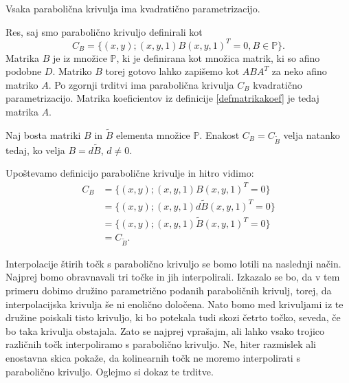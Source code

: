 \documentclass[mat1]{fmfdelo}
\newcommand{\PP}{\mathbb P}
\begin{document}
\begin{posledica}\label{vsakaparabola}
Vsaka parabolična krivulja ima kvadratično parametrizacijo.
\end{posledica}

\begin{dokaz}
Res, saj smo parabolično krivuljo definirali kot
$$ C_B = \{ (x,y); (x,y,1) B (x, y, 1)^T = 0, B \in \PP \}.$$
Matrika $B$ je iz množice $\PP$, ki je definirana kot množica matrik, ki so afino podobne $D$. Matriko $B$ torej gotovo lahko zapišemo kot $ABA^T$ za neko afino matriko $A$. Po zgornji trditvi ima parabolična krivulja $C_B$ kvadratično parametrizacijo. Matrika koeficientov iz definicije \ref{defmatrikakoef} je tedaj matrika $A$.
\end{dokaz}


\begin{posledica}\label{bb*}
Naj bosta matriki $B$ in $\widetilde{B}$ elementa množice $\PP$. Enakost $C_B = C_{\widetilde{B}}$ velja natanko tedaj, ko velja $B = d \widetilde{B}$, $d \neq 0$.
\end{posledica}

\begin{dokaz}
Upoštevamo definicijo parabolične krivulje in hitro vidimo:
\begin{align*}
C_B    &= \{ (x,y); (x,y,1) B (x, y, 1)^T = 0\} \\
	&= \{ (x,y); (x,y,1) d \widetilde{B} (x, y, 1)^T = 0\} \\
	&= \{ (x,y); (x,y,1) \widetilde{B} (x, y, 1)^T = 0\} \\
	&= C_{\widetilde{B}}.
\end{align*}
\end{dokaz}

Interpolacije štirih točk s parabolično krivuljo se bomo lotili na naslednji način. Najprej bomo obravnavali tri točke in jih interpolirali. Izkazalo se bo, da v tem primeru dobimo družino parametrično podanih paraboličnih krivulj, torej, da interpolacijska krivulja še ni enolično določena. Nato bomo med krivuljami iz te družine poiskali tisto krivuljo, ki bo potekala tudi skozi četrto točko, seveda, če bo taka krivulja obstajala. Zato se najprej vprašajm, ali lahko vsako trojico različnih točk interpoliramo s parabolično krivuljo. Ne, hiter razmislek ali enostavna skica pokaže, da kolinearnih točk ne moremo interpolirati s parabolično krivuljo. Oglejmo si dokaz te trditve. 
\end{document}
